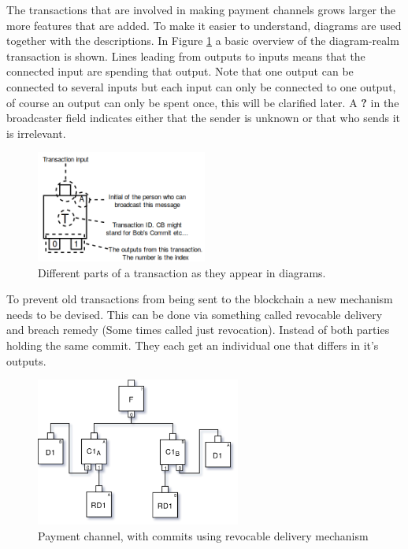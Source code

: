 The transactions that are involved in making payment channels grows larger the more features that are added. To make it easier to understand, diagrams are used together with the descriptions. In Figure \ref{fig:anatomy} a basic overview of the diagram-realm transaction is shown. Lines leading from outputs to inputs means that the connected input are spending that output. Note that one output can be connected to several inputs but each input can only be connected to one output, of course an output can only be spent once, this will be clarified later. A \textbf{?} in the broadcaster field indicates either that the sender is unknown or that who sends it is irrelevant. 


\begin{figure}[H]
	\centering
	\includegraphics[width=0.5\textwidth]{background/images/tx_anatomy.png}
	\caption{Different parts of a transaction as they appear in diagrams.}
	\label{fig:anatomy}
\end{figure}

\label{breach_remedy}
To prevent old transactions from being sent to the blockchain a new mechanism needs to be devised. This can be done via something called revocable delivery and breach remedy (Some times called just revocation).
Instead of both parties holding the same commit. They each get an individual one that differs in it's outputs. 

\begin{figure}[H]
	\centering
	\includegraphics[width=0.6\textwidth]{background/images/payment_channel_pre_breach.png}
	\caption{Payment channel, with commits using revocable delivery mechanism}
	\label{fig:pre-breach}
\end{figure}

